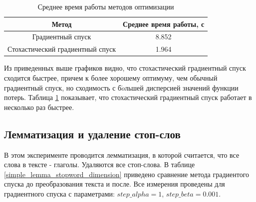 \documentclass[a4paper, 11pt]{article}
\begin{document}
           \begin{table}[H]
               \caption{Среднее время работы методов оптимизации}
               \label{sgd_gd_time}
               \begin{center}
                   \begin{tabular}{|c|c|}  
                       \hline 
                       Метод & Среднее время работы, с \\ 
                       \hline 
                       Градиентный спуск & 8.852 \\ 
                       \hline 
                       Стохастический градиентный спуск & 1.964 \\ 
                       \hline 
                   \end{tabular}
               \end{center}
           \end{table}
       
           Из приведенных выше графиков видно, что стохастический градиентный спуск сходится быстрее, причем к более хорошему оптимуму, чем обычный градиентный спуск, но сходимость с б$\acute{o}$льшей дисперсией значений функции потерь. Таблица \ref{sgd_gd_time} показывает, что стохастический градиентный спуск работает в несколько раз быстрее.
            
        \subsection{Лемматизация и удаление стоп-слов}
            В этом эксперименте проводится лемматизация, в которой считается, что все слова в тексте - глаголы. Удаляются все стоп-слова. В таблице \ref{simple_lemma_stopword_dimension} приведено сравнение метода градиентого спуска до преобразования текста и после. Все измерения проведены для градиентного спуска с параметрами: $step\_alpha=1$, $step\_beta=0.001$.
            
\end{document}
